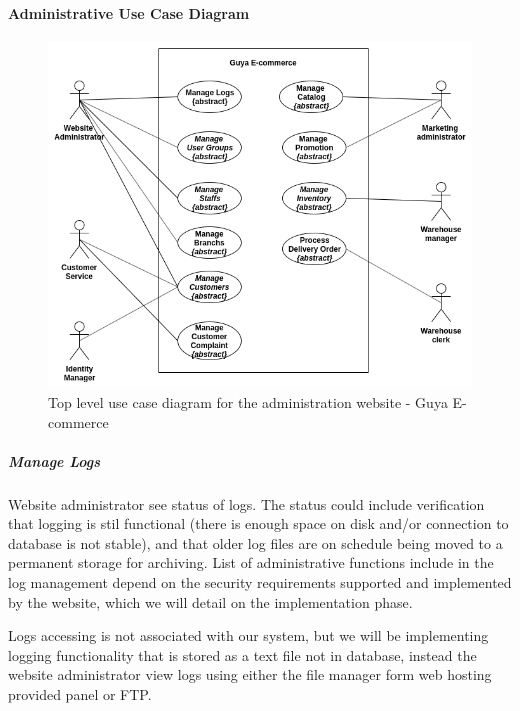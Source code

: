 \paragraph{Administrative Use Case Diagram}
\begin{figure}[!hb]
\includegraphics[width=15cm,keepaspectratio]{usecases/shop_admin_top_level_usecase}
\caption{Top level use case diagram for the administration website - Guya E-commerce}
\end{figure}

\subparagraph{Manage Logs}
Website administrator see status of logs. The status could include verification that logging is stil functional (there is enough space on disk and/or connection to database is not stable), and that older log files are on schedule being moved to a permanent storage for archiving. List of administrative functions include in the log management depend on the security requirements supported and implemented by the website, which we will detail on the implementation phase.

Logs accessing is not associated with our system, but we will be implementing logging functionality that is stored as a text file not in database, instead the website administrator view logs using either the file manager form web hosting provided panel or FTP.


